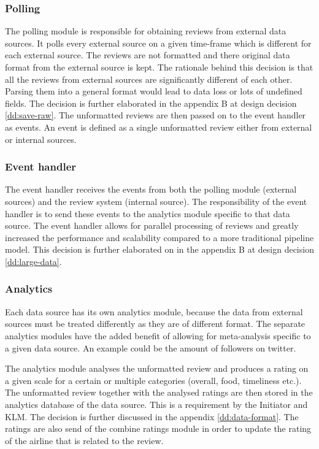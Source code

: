 \subsubsection{Polling}
The polling module is responsible for obtaining reviews from external data sources. It polls every external source on a given time-frame which is different for each external source. The reviews are not formatted and there original data format from the external source is kept. The rationale behind this decision is that all the reviews from external sources are significantly different of each other. Parsing them into a general format would lead to data loss or lots of undefined fields. The decision is further elaborated in the appendix B at design decision \ref{dd:save-raw}. The unformatted reviews are then passed on to the event handler as events. An event is defined as a single unformatted review either from external or internal sources.

\subsubsection{Event handler}
The event handler receives the events from both the polling module (external sources) and the review system (internal source). The responsibility of the event handler is to send these events to the analytics module specific to that data source. The event handler allows for parallel processing of reviews and greatly increased the performance and scalability compared to a more traditional pipeline model. This decision is further elaborated on in the appendix B at design decision \ref{dd:large-data}.

\subsubsection{Analytics}
Each data source has its own analytics module, because the data  from external sources must be treated differently as they are of different format. The separate analytics modules have the added benefit of allowing for meta-analysis specific to a given data source. An example could be the amount of followers on twitter.

The analytics module analyses the unformatted review and produces a rating on a given scale for a certain or multiple categories (overall, food, timeliness etc.). The unformatted review together with the analysed ratings are then stored in the analytics database of the data source. This is a requirement by the Initiator and KLM. The decision is further discussed in the appendix \ref{dd:data-format}. The ratings are also send of the combine ratings module in order to update the rating of the airline that is related to the review.


